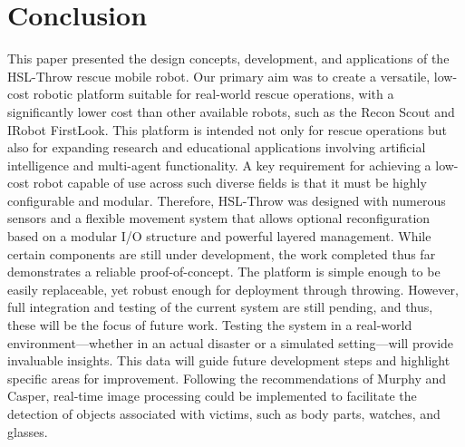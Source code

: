 \documentclass[conference]{IEEEtran}
\begin{document}
\section{Conclusion}
This paper presented the design concepts, development, and applications of the HSL-Throw rescue mobile robot. Our primary aim was to create a versatile, low-cost robotic platform suitable for real-world rescue operations, with a significantly lower cost than other available robots, such as the Recon Scout and IRobot FirstLook. This platform is intended not only for rescue operations but also for expanding research and educational applications involving artificial intelligence and multi-agent functionality. A key requirement for achieving a low-cost robot capable of use across such diverse fields is that it must be highly configurable and modular. Therefore, HSL-Throw was designed with numerous sensors and a flexible movement system that allows optional reconfiguration based on a modular I/O structure and powerful layered management. While certain components are still under development, the work completed thus far demonstrates a reliable proof-of-concept. The platform is simple enough to be easily replaceable, yet robust enough for deployment through throwing. However, full integration and testing of the current system are still pending, and thus, these will be the focus of future work. Testing the system in a real-world environment—whether in an actual disaster or a simulated setting—will provide invaluable insights. This data will guide future development steps and highlight specific areas for improvement. Following the recommendations of Murphy and Casper, real-time image processing could be implemented to facilitate the detection of objects associated with victims, such as body parts, watches, and glasses.



\end{document}
